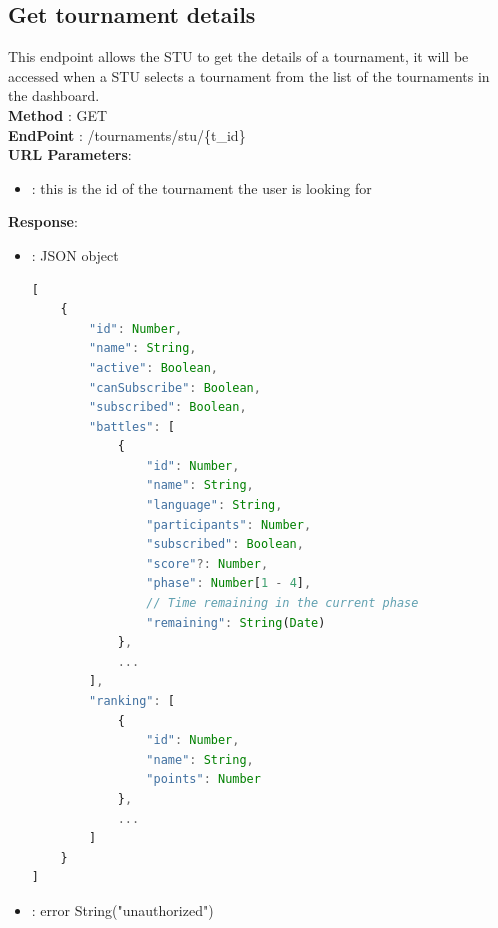 \subsection*{Get tournament details}
This endpoint allows the STU to get the details of a tournament, it will be accessed when a STU selects a tournament from the list of the tournaments in the dashboard.\\
\textbf{Method} : GET \\
\textbf{EndPoint} : /tournaments/stu/\{t\_id\}\\
\textbf{URL Parameters}:
\begin{itemize}
    \item {} : this is the id of the tournament the user is looking for
\end{itemize}
\textbf{Response}:
\begin{itemize}
    \item {} : JSON object
          \begin{lstlisting}[language=JavaScript, label={lst:jscode}, basicstyle=\ttfamily]
[
    {
        "id": Number,
        "name": String,
        "active": Boolean,
        "canSubscribe": Boolean,
        "subscribed": Boolean,
        "battles": [
            {
                "id": Number,
                "name": String,
                "language": String,
                "participants": Number,
                "subscribed": Boolean,
                "score"?: Number,
                "phase": Number[1 - 4],
                // Time remaining in the current phase
                "remaining": String(Date)
            },
            ...
        ],
        "ranking": [
            {
                "id": Number,
                "name": String,
                "points": Number
            },
            ...
        ]
    }
]
            \end{lstlisting}
    \item {} : error String("unauthorized")
\end{itemize}

